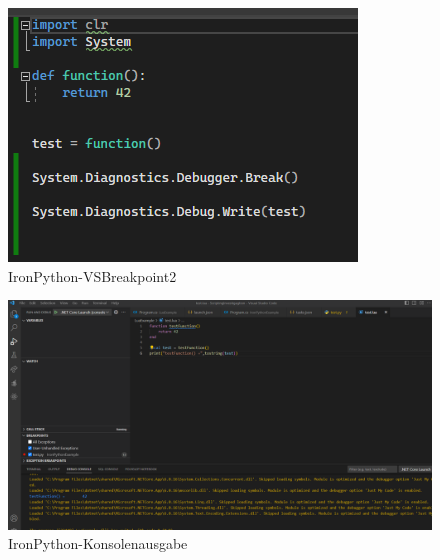 \begin{itemize}
    \begin{figure}[H]
        \centering
        \includegraphics{pics/IronPythonVSBreakpoint2.png}
        \caption{IronPython-VSBreakpoint2}
        \label{fig:impl:IronPythonVSBreakpoint2}
    \end{figure}

    \begin{figure}[H]
        \centering
        \includegraphics[scale=0.5]{pics/IronPythonKonsolenausgabe.png}
        \caption{IronPython-Konsolenausgabe}
        \label{fig:impl:IronPythonKonsolenausgabe}
    \end{figure}
\end{itemize}